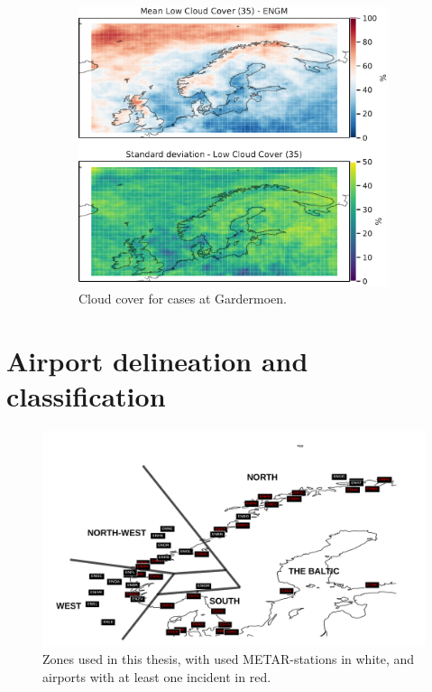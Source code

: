 \begin{figure}
    \begin{subfigure}[b]{0.5\textwidth}
    \centering
    \includegraphics[width=\textwidth]{Figures/CCENGM.pdf}
    \caption{Cloud cover for cases at Gardermoen.}
    \label{fig:ENGMCC}
\end{subfigure}
\caption{ }
\label{fig:cloudcoverairports}
\end{figure}

\cleardoublepage


\chapter{Airport delineation and classification}

\begin{figure}
    \centering
    \includegraphics[width=\textwidth]{Figures/METARandHIT.pdf}
    \caption{Zones used in this thesis, with used METAR-stations in white, and airports with at least one incident in red.}
    \label{fig:Stationsmap}
\end{figure}

